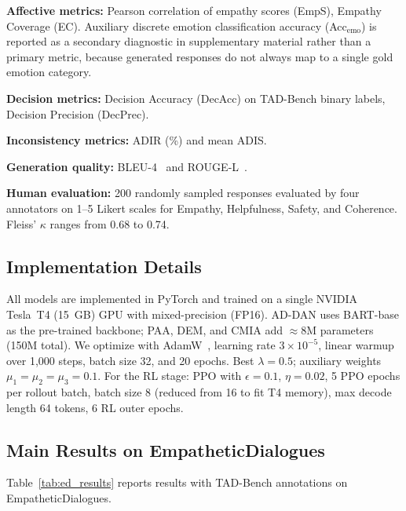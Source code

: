 \documentclass[lettersize,journal]{IEEEtran}
\begin{document}
\textbf{Affective metrics:} Pearson correlation of empathy scores (EmpS),
Empathy Coverage (EC).  Auxiliary discrete emotion classification accuracy
(Acc$_\mathrm{emo}$) is reported as a secondary diagnostic in supplementary
material rather than a primary metric, because generated responses do not
always map to a single gold emotion category.

\textbf{Decision metrics:} Decision Accuracy (DecAcc) on TAD-Bench binary
labels, Decision Precision (DecPrec).

\textbf{Inconsistency metrics:} ADIR (\%) and mean ADIS.

\textbf{Generation quality:} BLEU-4~\cite{papineni2002bleu} and
ROUGE-L~\cite{lin2004rouge}.

\textbf{Human evaluation:} 200 randomly sampled responses evaluated by four
annotators on 1--5 Likert scales for Empathy, Helpfulness, Safety, and
Coherence.  Fleiss' $\kappa$ ranges from 0.68 to 0.74.

\subsection{Implementation Details}

All models are implemented in PyTorch and trained on a single NVIDIA
Tesla~T4 (15~GB) GPU with mixed-precision (FP16).  AD-DAN uses BART-base as
the pre-trained backbone; PAA, DEM, and CMIA add $\approx\!8$M parameters
(150M total).  We optimize with AdamW~\cite{loshchilov2019adamw},
learning rate $3{\times}10^{-5}$, linear warmup over 1,000 steps,
batch size 32, and 20 epochs.  Best $\lambda{=}0.5$; auxiliary weights
$\mu_1{=}\mu_2{=}\mu_3{=}0.1$.  For the RL stage: PPO with $\epsilon{=}0.1$,
$\eta{=}0.02$, 5 PPO epochs per rollout batch, batch size 8
(reduced from 16 to fit T4 memory), max decode length 64 tokens,
6 RL outer epochs.

\subsection{Main Results on EmpatheticDialogues}

Table~\ref{tab:ed_results} reports results with TAD-Bench annotations on
EmpatheticDialogues.
\end{document}
